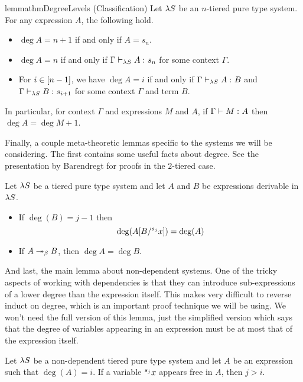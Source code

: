 \documentclass{article}
\begin{document}
\begin{restatable}{lemma}{thmDegreeLevels}
\label{lem:classification}
(Classification)
Let $\lS$ be an $n$-tiered pure type system.
For any expression $A$, the following hold.
\begin{itemize}
    \item $\deg A = n + 1$ if and only if $A = s_n$.
    \item $\deg A = n$ if and only if $\judgment[\lS] \Gamma A {s_n}$ for some context $\Gamma$.
    \item For $i \in \upto {n - 1}$, we have $\deg A = i$ if and only if $\judgment[\lS] \Gamma A B$ and $\judgment[\lS] \Gamma B {s_{i + 1}}$ for some context $\Gamma$ and term $B$.
\end{itemize}
In particular, for context $\Gamma$ and expressions $M$ and $A$, if $\judgment \Gamma M A$ then $\deg A = \deg M + 1$.
\end{restatable}

Finally, a couple meta-theoretic lemmas specific to the systems we will be considering.
The first contains some useful facts about degree.
See the presentation by Barendregt \cite{barendregt-1993} for proofs in the $2$-tiered case.

\begin{lemma}
\label{lem:deg-facts}
Let $\lS$ be a tiered pure type system and let $A$ and $B$ be expressions derivable in $\lS$.
\begin{itemize}
\item If $\deg(B) = j - 1$ then
\[
\deg(\sub A B {\svar j x}) = \deg(A)
\]
\item If $A \multistepbeta B$, then $\deg A = \deg B$.
\end{itemize}
\end{lemma}

And last, the main lemma about non-dependent systems.
One of the tricky aspects of working with dependencies is that they can introduce sub-expressions of a lower degree than the expression itself.
This makes very difficult to reverse induct on degree, which is an important proof technique we will be using.
We won't need the full version of this lemma, just the simplified version which says that the degree of variables appearing in an expression must be at most that of the expression itself.

\begin{lemma}
\label{lem:free-var-non-dep}
Let $\lS$ be a non-dependent tiered pure type system and let $A$ be an expression such that $\deg(A) = i$.
If a variable $\svar j x$ appears free in $A$, then $j > i$.
\end{lemma}
\end{document}
